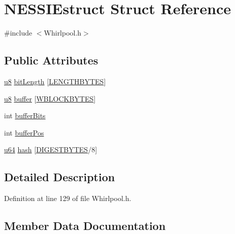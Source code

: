 \hypertarget{struct_n_e_s_s_i_estruct}{}\section{N\+E\+S\+S\+I\+Estruct Struct Reference}
\label{struct_n_e_s_s_i_estruct}


{\ttfamily \#include $<$Whirlpool.\+h$>$}

\subsection*{Public Attributes}
\begin{DoxyCompactItemize}
\item 
\hyperlink{_whirlpool_8h_aed742c436da53c1080638ce6ef7d13de}{u8} \hyperlink{struct_n_e_s_s_i_estruct_ad0530e8b6840061bffabc2b244af3923}{bit\+Length} \mbox{[}\hyperlink{_whirlpool_8h_a9dabcec09fcd1c75ae5c2e0bdb103f3f}{L\+E\+N\+G\+T\+H\+B\+Y\+T\+ES}\mbox{]}
\item 
\hyperlink{_whirlpool_8h_aed742c436da53c1080638ce6ef7d13de}{u8} \hyperlink{struct_n_e_s_s_i_estruct_ac52a1bce30ce731d8dc66b07986d9e04}{buffer} \mbox{[}\hyperlink{_whirlpool_8h_afef17cf4c74a9ab0ed7cee5219394366}{W\+B\+L\+O\+C\+K\+B\+Y\+T\+ES}\mbox{]}
\item 
int \hyperlink{struct_n_e_s_s_i_estruct_aa55f5f9b992b4d1937b88125171b3886}{buffer\+Bits}
\item 
int \hyperlink{struct_n_e_s_s_i_estruct_a9bf66bb21e68e6dce08efd3671ec0f13}{buffer\+Pos}
\item 
\hyperlink{_whirlpool_8h_ad758b7a5c3f18ed79d2fcd23d9f16357}{u64} \hyperlink{struct_n_e_s_s_i_estruct_a2736107035063134f67f3e956889b30b}{hash} \mbox{[}\hyperlink{_whirlpool_8h_a5dd8ae4ea5670bfa53f78909ed32b3b3}{D\+I\+G\+E\+S\+T\+B\+Y\+T\+ES}/8\mbox{]}
\end{DoxyCompactItemize}


\subsection{Detailed Description}


Definition at line 129 of file Whirlpool.\+h.



\subsection{Member Data Documentation}
\mbox{\label{struct_n_e_s_s_i_estruct_ad0530e8b6840061bffabc2b244af3923}} 
